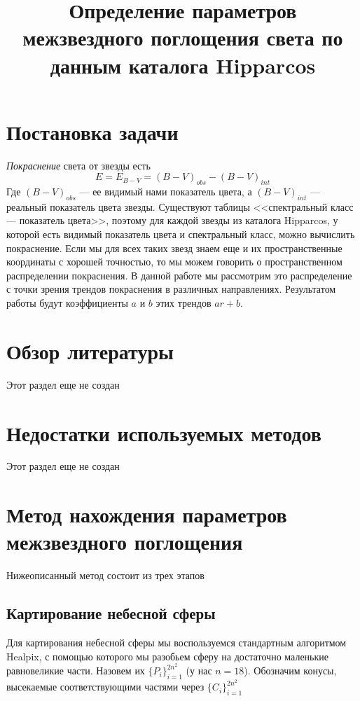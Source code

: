 \documentclass[14pt]{article}
\title{\bf Определение параметров межзвездного поглощения света по данным каталога Hipparcos}
\begin{document}
    \maketitle
    
    \section{Постановка задачи}
        {\it Покраснение} света от звезды есть
        $$
            E = E_{B - V} = (B - V)_{obs} - (B - V)_{int}    
        $$ 
        Где $(B - V)_{obs}$ --- ее видимый нами показатель цвета, а $(B - V)_{int}$ --- реальный показатель цвета звезды. Существуют таблицы <<спектральный класс --- показатель цвета>>, поэтому для каждой звезды из каталога Hipparcos, у которой есть видимый показатель цвета и спектральный класс, можно вычислить покраснение. Если мы для всех таких звезд знаем еще и их пространственные координаты с хорошей точностью, то мы можем говорить о пространственном распределении покраснения. В данной работе мы рассмотрим это распределение с точки зрения трендов покраснения в различных направлениях. Результатом работы будут коэффициенты $a$ и $b$ этих трендов $ar + b$. 
        
    \section{Обзор литературы}
        Этот раздел еще не создан
        
    \section{Недостатки используемых методов}
        Этот раздел еще не создан
        
    \section{Метод нахождения параметров межзвездного поглощения}
    
        Нижеописанный метод состоит из трех этапов
    
        \subsection{Картирование небесной сферы}
            Для картирования небесной сферы мы воспользуемся стандартным алгоритмом Healpix, с помощью которого мы разобьем сферу на достаточно маленькие равновеликие части. Назовем их $\{P_i\}_{i = 1}^{2n^2}$ (у нас $n = 18$). Обозначим конусы, высекаемые соответствующими частями через $\{C_i\}_{i = 1}^{2n^2}$\\
        
\end{document}
